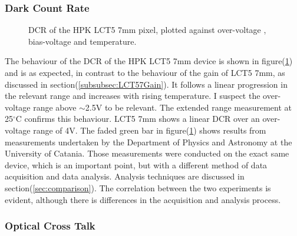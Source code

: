 \documentclass[12pt,article,type=msc,colorback,accentcolor=tud9c]{tudthesis}
\begin{document}
\newpage
\subsubsection{Dark Count Rate}
\label{subsubsec:LCT57DCR}
\begin{figure}[h!]
\begin{centering}
\caption[LCT5 7mm DCR]{DCR of the HPK LCT5 7mm pixel, plotted against over-voltage , bias-voltage and temperature.}
\label{fig:LCT57_DCR}
\end{centering}
\end{figure}
The behaviour of the DCR of the HPK LCT5 7mm device is shown in figure(\ref{fig:LCT57_DCR}) and is as expected, in contrast to the behaviour of the gain of LCT5 7mm, as discussed in section(\ref{subsubsec:LCT57Gain}). It follows a linear progression in the relevant range and increases with rising temperature. I suspect the over-voltage range above $\sim$2.5V to be relevant. The extended range measurement at 25$^\circ$C confirms this behaviour. LCT5 7mm shows a linear DCR over an over-voltage range of 4V. The faded green bar in figure(\ref{fig:LCT57_DCR}) shows results from measurements undertaken by the Department of Physics and Astronomy at the University of Catania. Those measurements were conducted on the exact same device, which is an important point, but with a different method of data acquisition and data analysis. Analysis techniques are discussed in section(\ref{sec:comparison}). The correlation between the two experiments is evident, although there is differences in the acquisition and analysis process.


\subsubsection{Optical Cross Talk}
\end{document}
